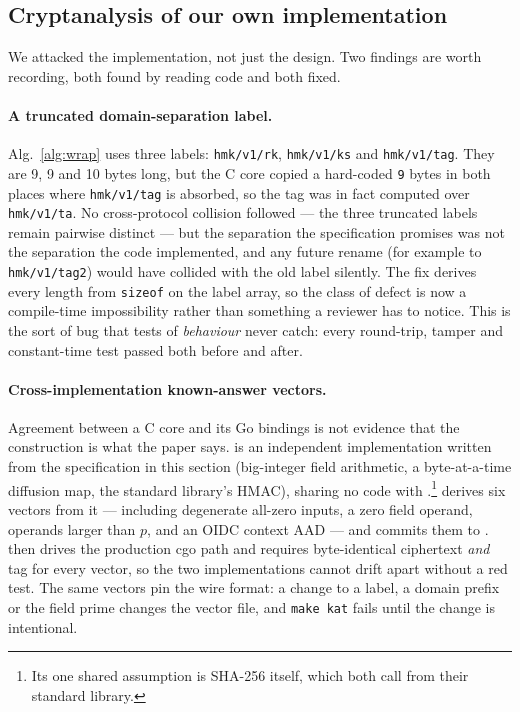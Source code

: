 \subsection{Cryptanalysis of our own implementation}
\label{sec:selfattack}
We attacked the implementation, not just the design. Two findings are worth
recording, both found by reading code and both fixed.

\paragraph{A truncated domain-separation label.}
Alg.~\ref{alg:wrap} uses three labels: \texttt{hmk/v1/rk}, \texttt{hmk/v1/ks}
and \texttt{hmk/v1/tag}. They are 9, 9 and 10 bytes long, but the C core copied
a hard-coded \texttt{9} bytes in both places where \texttt{hmk/v1/tag} is
absorbed, so the tag was in fact computed over \texttt{hmk/v1/ta}. No
cross-protocol collision followed --- the three truncated labels remain
pairwise distinct --- but the separation the specification promises was not the
separation the code implemented, and any future rename (for example to
\texttt{hmk/v1/tag2}) would have collided with the old label silently. The fix
derives every length from \texttt{sizeof} on the label array, so the class of
defect is now a compile-time impossibility rather than something a reviewer has
to notice. This is the sort of bug that tests of \emph{behaviour} never catch:
every round-trip, tamper and constant-time test passed both before and after.

\paragraph{Cross-implementation known-answer vectors.}
Agreement between a C core and its Go bindings is not evidence that the
construction is what the paper says.  is an
independent implementation written from the specification in this section
(big-integer field arithmetic, a byte-at-a-time diffusion map, the standard
library's HMAC), sharing no code with .\footnote{Its one shared
assumption is SHA-256 itself, which both call from their standard library.}
 derives six vectors from it --- including degenerate
all-zero inputs, a zero field operand, operands larger than $p$, and an OIDC
context AAD --- and commits them to .
 then drives the production cgo path and
requires byte-identical ciphertext \emph{and} tag for every vector, so the two
implementations cannot drift apart without a red test. The same vectors pin the
wire format: a change to a label, a domain prefix or the field prime changes
the vector file, and \texttt{make kat} fails until the change is intentional.

